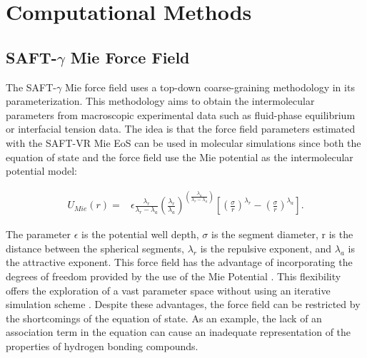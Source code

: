 \documentclass[final,12p,times,twocolumn]{elsarticle}
\begin{document}
	
	
	
	\section{Computational Methods}
	
	\subsection{SAFT-$\gamma$ Mie Force Field}
	
	The SAFT-$\gamma$ Mie force field uses a top-down coarse-graining methodology in its parameterization. This methodology aims to obtain the intermolecular parameters from macroscopic experimental data such as fluid-phase equilibrium or interfacial tension data. The idea is that the force field parameters estimated with the SAFT-VR Mie EoS \cite{lafitte2013} can be used in molecular simulations since both the equation of state and the force field use the Mie potential as the intermolecular potential model:
	
	\begin{equation}
	\begin{aligned}
	U_{Mie}(r) {}=& \epsilon\frac{\lambda_r}{\lambda_r - \lambda_a} \left(\frac{\lambda_r}{\lambda_a} \right)^{\left( \frac{\lambda_a}{\lambda_r - \lambda_a} \right)}  \left[ \left(\frac{\sigma}{r} \right)^{\lambda_r} - \left(\frac{\sigma}{r} \right)^{\lambda_a} \right].
	\end{aligned}
	\label{eqn:miepotential}
	\end{equation}
	
	The parameter $\epsilon$ is the potential well depth, $\sigma$ is the segment diameter, r is the distance between the spherical segments, $\lambda_r$ is the repulsive exponent, and $\lambda_a$ is the attractive exponent. This force field has the advantage of incorporating the degrees of freedom provided by the use of the Mie Potential \cite{herdes2015}. This flexibility offers the exploration of a vast parameter space without using an iterative simulation scheme \cite{avendano2011}. Despite these advantages, the force field can be restricted by the shortcomings of the equation of state. As an example, the lack of an association term in the equation can cause an inadequate representation of the properties of hydrogen bonding compounds.
	
\end{document}
